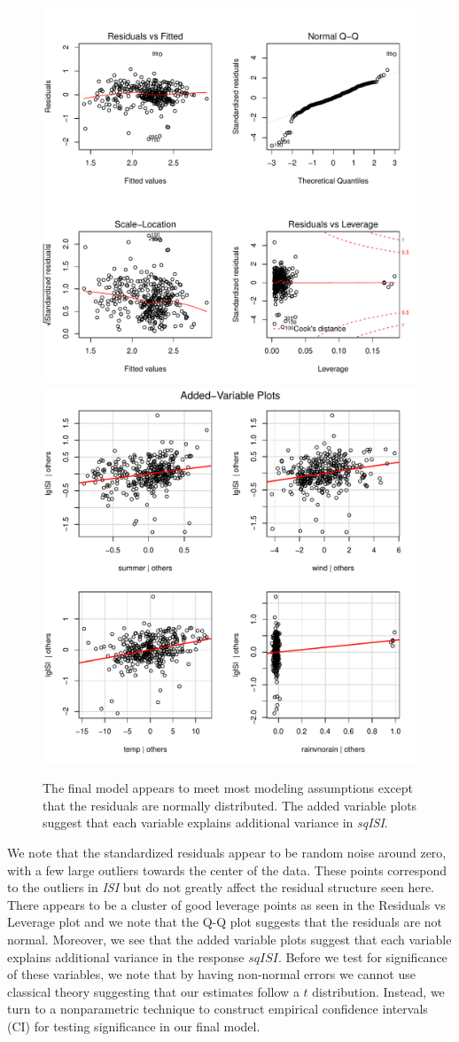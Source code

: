 \documentclass{article}
\begin{document}
\begin{figure}[h!]
\centering
\includegraphics[width=.45\textwidth]{final_model_diag.pdf}
\includegraphics[width =.45\textwidth]{final_avp.pdf}
\caption{The final model appears to meet most modeling assumptions except that the residuals are normally distributed. The added variable plots suggest that each variable explains additional variance in \textit{sqISI}.}
\label{fig:fin_model}{}
\end{figure}
We note that the standardized residuals appear to be random noise around zero, with a few large outliers towards the center of the data. These points correspond to the outliers in \textit{ISI} but do not greatly affect the residual structure seen here. There appears to be a cluster of good leverage points as seen in the Residuals vs Leverage plot and we note that the Q-Q plot suggests that the residuals are not normal. Moreover, we see that the added variable plots suggest that each variable explains additional variance in the response $\textit{sqISI}$. Before we test for significance of these variables, we note that by having non-normal errors we cannot use classical theory suggesting that our estimates follow a $t$ distribution. Instead, we turn to a nonparametric technique to construct empirical confidence intervals (CI) for testing significance in our final model. 
\end{document}
